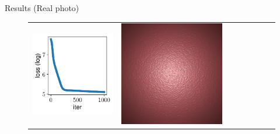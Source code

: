 \documentclass[final]{beamer}
\newlength{\twocolwid}
\newlength{\resultwidth}
\begin{document}
\begin{frame}[t]
\begin{columns}[t]
\begin{column}{\twocolwid}
\begin{block}{Results (Real photo)}
\begin{figure}[t]
\begin{tabular}{ccrclccc}
            		\includegraphics[width=\resultwidth]{images/real/bump/loss.pdf} &
            		\includegraphics[width=\resultwidth]{images/real/bump/optim.jpg} &

\end{tabular}
\end{figure}
\end{block}
\end{column}
\end{columns}
\end{frame}
\end{document}
